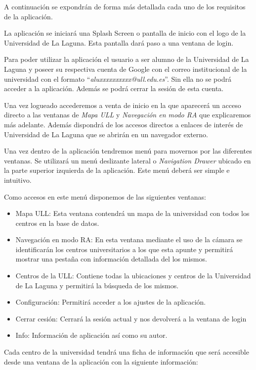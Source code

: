 A continuación se expondrán de forma más detallada cada uno de los requisitos de la aplicación.

La aplicación se iniciará una Splash Screen\cite{URL::SplashScreen} o pantalla de inicio con el logo de la Universidad de La Laguna. Esta pantalla dará paso a una ventana de login.

Para poder utilizar la aplicación el usuario a ser alumno de la Universidad de La Laguna y poseer su respectiva cuenta de Google con el correo institucional de la universidad con el formato ``\textit{aluxxxxxxxxxx@ull.edu.es}''. Sin ella no se podrá acceder a la aplicación. Además se podrá cerrar la sesión de esta cuenta.

Una vez logueado accederemos a venta de inicio en la que aparecerá un acceso directo a las ventanas de \textit{Mapa ULL} y \textit{Navegación en modo RA} que explicaremos más adelante. Además dispondrá de los accesos directos a enlaces de interés de Universidad de La Laguna que se abrirán en un navegador externo.

Una vez dentro de la aplicación tendremos menú para movernos por las diferentes ventanas. Se utilizará un menú deslizante lateral o \textit{Navigation Drawer}\cite{URL::NavigationDraw} ubicado en la parte superior izquierda de la aplicación. Este menú deberá ser simple e intuitivo.

Como accesos en este menú disponemos de las siguientes ventanas:

\begin{itemize}
    \item Mapa ULL: Esta ventana contendrá un mapa de la universidad con todos los centros en la base de datos. 
    \item Navegación en modo RA: En esta ventana mediante el uso de la cámara se identificarán los centros universitarios a los que esta apunte y permitirá mostrar una pestaña con información detallada del los mismos.
    \item Centros de la ULL: Contiene todas la ubicaciones y centros de la Universidad de La Laguna y permitirá la búsqueda de los mismos. 
    \item Configuración: Permitirá acceder a los ajustes de la aplicación.
    \item Cerrar cesión: Cerrará la sesión actual y nos devolverá a la ventana de login
    \item Info: Información de aplicación así como su autor.
\end{itemize}

Cada centro de la universidad tendrá una ficha de información que será accesible desde una ventana de la aplicación con la siguiente información:

